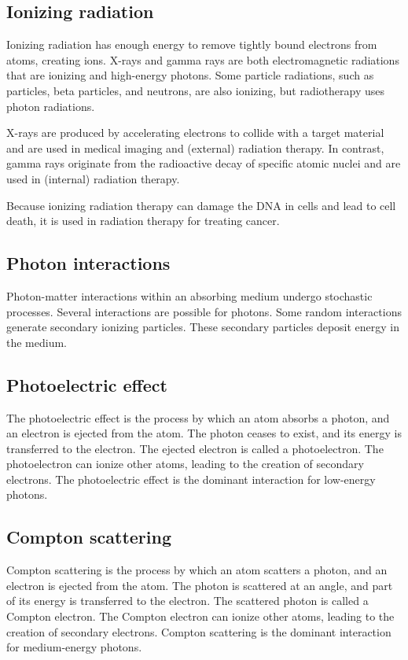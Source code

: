 \subsection{Ionizing radiation}
Ionizing radiation has enough energy to remove tightly bound electrons from atoms, creating ions.
X-rays and gamma rays are both electromagnetic radiations that are ionizing and high-energy photons.
Some particle radiations, such as particles, beta particles, and neutrons, are also ionizing, but radiotherapy uses photon radiations.

X-rays are produced by accelerating electrons to collide with a target material and are used in medical imaging and (external) radiation therapy.
In contrast, gamma rays originate from the radioactive decay of specific atomic nuclei and are used in (internal) radiation therapy. 

Because ionizing radiation therapy can damage the DNA in cells and lead to cell death, it is used in radiation therapy for treating cancer.

\subsection{Photon interactions}
Photon-matter interactions within an absorbing medium undergo stochastic processes.
Several interactions are possible for photons.
Some random interactions generate secondary ionizing particles.
These secondary particles deposit energy in the medium.

\subsection{Photoelectric effect}
The photoelectric effect is the process by which an atom absorbs a photon, and an electron is ejected from the atom.
The photon ceases to exist, and its energy is transferred to the electron.
The ejected electron is called a photoelectron.
The photoelectron can ionize other atoms, leading to the creation of secondary electrons.
The photoelectric effect is the dominant interaction for low-energy photons.

\subsection{Compton scattering}
Compton scattering is the process by which an atom scatters a photon, and an electron is ejected from the atom.
The photon is scattered at an angle, and part of its energy is transferred to the electron.
The scattered photon is called a Compton electron.
The Compton electron can ionize other atoms, leading to the creation of secondary electrons.
Compton scattering is the dominant interaction for medium-energy photons.

